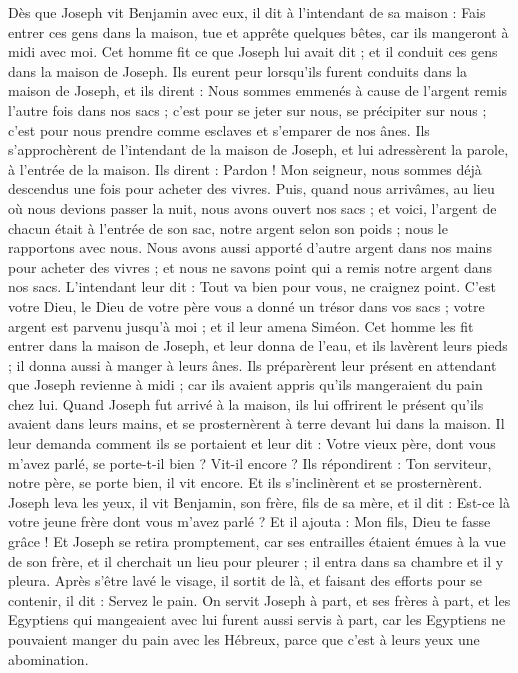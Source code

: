 \begin{multicols}{2}
Dès que Joseph vit Benjamin avec eux, il dit à l’intendant de sa maison : Fais entrer ces gens dans la maison, tue et apprête quelques bêtes, car ils mangeront à midi avec moi.
Cet homme fit ce que Joseph lui avait dit ; et il conduit ces gens dans la maison de Joseph.
Ils eurent peur lorsqu’ils furent conduits dans la maison de Joseph, et ils dirent : Nous sommes emmenés à cause de l'argent remis l’autre fois dans nos sacs ; c’est pour se jeter sur nous, se précipiter sur nous ; c’est pour nous prendre comme esclaves et s’emparer de nos ânes.
Ils s’approchèrent de l’intendant de la maison de Joseph, et lui adressèrent la parole, à l’entrée de la maison.
Ils dirent : Pardon ! Mon seigneur, nous sommes déjà descendus une fois pour acheter des vivres.
Puis, quand nous arrivâmes, au lieu où nous devions passer la nuit, nous avons ouvert nos sacs ; et voici, l’argent de chacun était à l’entrée de son sac, notre argent selon son poids ;  nous le rapportons avec nous.
Nous avons aussi apporté d'autre argent dans nos mains pour acheter des vivres ; et nous ne savons point qui a remis notre argent dans nos sacs.
L’intendant leur dit : Tout va bien pour vous, ne craignez point. C’est votre Dieu, le Dieu de votre père vous a donné un trésor dans vos sacs ; votre argent est parvenu jusqu'à moi ; et il leur amena Siméon.
Cet homme les fit entrer dans la maison de Joseph, et leur donna de l'eau, et ils lavèrent leurs pieds ; il donna aussi à manger à leurs ânes.
Ils préparèrent leur présent en attendant que Joseph revienne à midi ; car ils avaient appris qu'ils mangeraient du pain chez lui.
Quand  Joseph fut arrivé à la maison, ils lui offrirent le présent qu'ils avaient dans leurs mains, et se prosternèrent à terre devant lui dans la maison.
Il leur demanda comment ils se portaient et leur dit : Votre vieux père, dont vous m'avez parlé, se porte-t-il bien ? Vit-il encore ?
Ils répondirent : Ton serviteur, notre père, se porte bien, il vit encore. Et ils s’inclinèrent et se prosternèrent.
Joseph leva les yeux, il vit Benjamin, son frère, fils de sa mère, et il dit : Est-ce là votre jeune frère dont vous m'avez parlé ? Et il ajouta : Mon fils, Dieu te fasse grâce !
Et Joseph se retira promptement, car ses entrailles étaient émues à la vue de son frère, et il cherchait un lieu pour pleurer ; il entra dans sa chambre et il y pleura.
Après s’être lavé le visage, il sortit de là, et faisant des efforts pour se contenir, il dit : Servez le pain.
On servit Joseph à part, et ses frères à part, et les Egyptiens qui mangeaient avec lui furent aussi servis à part, car les Egyptiens ne pouvaient manger du pain avec les Hébreux,  parce que c’est à leurs yeux une abomination.

\end{multicols}
